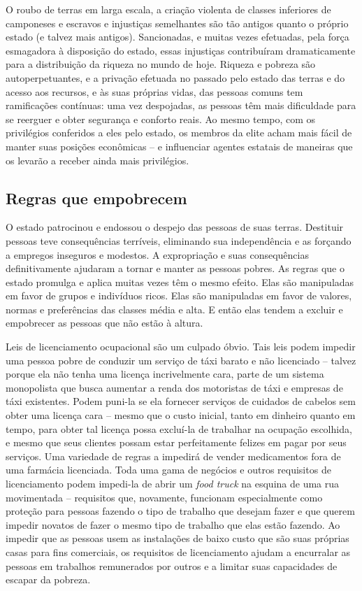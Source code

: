 O roubo de terras em larga escala, a criação violenta de classes inferiores de camponeses e escravos e injustiças semelhantes são tão antigos quanto o próprio estado (e talvez mais antigos). Sancionadas, e muitas vezes efetuadas, pela força esmagadora à disposição do estado, essas injustiças contribuíram dramaticamente para a distribuição da riqueza no mundo de hoje. Riqueza e pobreza são autoperpetuantes, e a privação efetuada no passado pelo estado das terras e do acesso aos recursos, e às suas próprias vidas, das pessoas comuns tem ramificações contínuas: uma vez despojadas, as pessoas têm mais dificuldade para se reerguer e obter segurança e conforto reais. Ao mesmo tempo, com os privilégios conferidos a eles pelo estado, os membros da elite acham mais fácil de manter suas posições econômicas -- e influenciar agentes estatais de maneiras que os levarão a receber ainda mais privilégios.

\subsection*{Regras que empobrecem}

O estado patrocinou e endossou o despejo das pessoas de suas terras. Destituir pessoas teve consequências terríveis, eliminando sua independência e as forçando a empregos inseguros e modestos. A expropriação e suas consequências definitivamente ajudaram a tornar e manter as pessoas pobres. As regras que o estado promulga e aplica muitas vezes têm o mesmo efeito. Elas são manipuladas em favor de grupos e indivíduos ricos. Elas são manipuladas em favor de valores, normas e preferências das classes média e alta. E então elas tendem a excluir e empobrecer as pessoas que não estão à altura.

Leis de licenciamento ocupacional são um culpado óbvio. Tais leis podem impedir uma pessoa pobre de conduzir um serviço de táxi barato e não licenciado -- talvez porque ela não tenha uma licença incrivelmente cara, parte de um sistema monopolista que busca aumentar a renda dos motoristas de táxi e empresas de táxi existentes. Podem puni-la se ela fornecer serviços de cuidados de cabelos sem obter uma licença cara -- mesmo que o custo inicial, tanto em dinheiro quanto em tempo, para obter tal licença possa excluí-la de trabalhar na ocupação escolhida, e mesmo que seus clientes possam estar perfeitamente felizes em pagar por seus serviços. Uma variedade de regras a impedirá de vender medicamentos fora de uma farmácia licenciada. Toda uma gama de negócios e outros requisitos de licenciamento podem impedi-la de abrir um \emph{food truck} na esquina de uma rua movimentada -- requisitos que, novamente, funcionam especialmente como proteção para pessoas fazendo o tipo de trabalho que desejam fazer e que querem impedir novatos de fazer o mesmo tipo de trabalho que elas estão fazendo. Ao impedir que as pessoas usem as instalações de baixo custo que são suas próprias casas para fins comerciais, os requisitos de licenciamento ajudam a encurralar as pessoas em trabalhos remunerados por outros e a limitar suas capacidades de escapar da pobreza.

